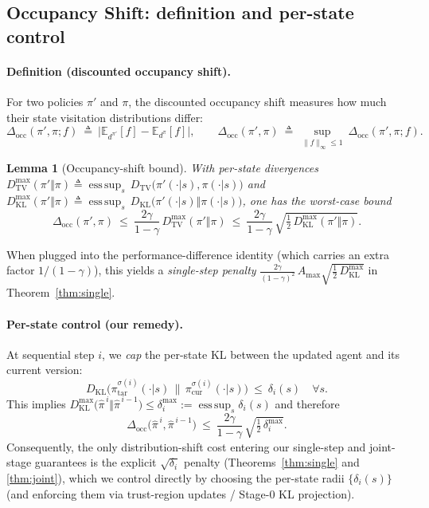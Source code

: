 \documentclass[sigconf]{aamas}
\newtheorem{lemma}[theorem]{Lemma}
\DeclareMathOperator*{\esssup}{ess\,sup}
\newcommand{\E}{\mathbb{E}}
\newcommand{\KL}{D_{\mathrm{KL}}}
\newcommand{\TV}{D_{\mathrm{TV}}}
\begin{document}
\subsection{Occupancy Shift: definition and per-state control}
\label{subsec:occ-shift-main}

\paragraph{Definition (discounted occupancy shift).}
For two policies $\pi'$ and $\pi$, the discounted occupancy shift measures how much their state visitation distributions differ:
\[
\Delta_{\mathrm{occ}}(\pi',\pi;f)\ \triangleq\ \big|\E_{d^{\pi'}}[f]-\E_{d^{\pi}}[f]\big|,
\qquad
\Delta_{\mathrm{occ}}(\pi',\pi)\ \triangleq\ \sup_{\|f\|_{\infty}\le 1}\ \Delta_{\mathrm{occ}}(\pi',\pi;f).
\]

\begin{lemma}[Occupancy-shift bound]\label{lem:occ-shift}
With per-state divergences
$\TV^{\max}(\pi'\Vert\pi)\!\triangleq\!\esssup_{s}\,\TV\!\big(\pi'(\cdot|s),\pi(\cdot|s)\big)$
and
$\KL^{\max}(\pi'\Vert\pi)\!\triangleq\!\esssup_{s}\,\KL\!\big(\pi'(\cdot|s)\Vert\pi(\cdot|s)\big)$,
one has the worst-case bound
\[
\Delta_{\mathrm{occ}}(\pi',\pi)\ \le\ \frac{2\gamma}{1-\gamma}\,\TV^{\max}(\pi'\Vert\pi)
\ \le\ \frac{2\gamma}{1-\gamma}\,\sqrt{\tfrac12\,\KL^{\max}(\pi'\Vert\pi)}.
\]
\end{lemma}

When plugged into the performance-difference identity (which carries an extra factor $1/(1-\gamma)$), this yields a \emph{single-step penalty}
$\tfrac{2\gamma}{(1-\gamma)^2}\,A_{\max}\sqrt{\tfrac12\,\KL^{\max}}$
in Theorem~\ref{thm:single}.
\paragraph{Per-state control (our remedy).}
At sequential step $i$, we \emph{cap} the per-state KL between the updated agent and its current version:
\[
\KL\!\big(\pi^{\sigma(i)}_{\mathrm{tar}}(\cdot|s)\,\big\|\,\pi^{\sigma(i)}_{\mathrm{cur}}(\cdot|s)\big)\ \le\ \delta_i(s)\quad\forall s.
\]
This implies $\KL^{\max}\!\big(\hat\pi^{\,i}\Vert\hat\pi^{\,i-1}\big)\le \delta_i^{\max}:=\esssup_s\delta_i(s)$ and therefore
\[
\Delta_{\mathrm{occ}}\!\big(\hat\pi^{\,i},\hat\pi^{\,i-1}\big)\ \le\ \frac{2\gamma}{1-\gamma}\,\sqrt{\tfrac12\,\delta_i^{\max}}.
\]
Consequently, the only distribution-shift cost entering our single-step and joint-stage guarantees is the explicit $\sqrt{\delta_i}$ penalty (Theorems~\ref{thm:single} and \ref{thm:joint}), which we control directly by choosing the per-state radii $\{\delta_i(s)\}$ (and enforcing them via trust-region updates / Stage-0 KL projection).
\end{document}
